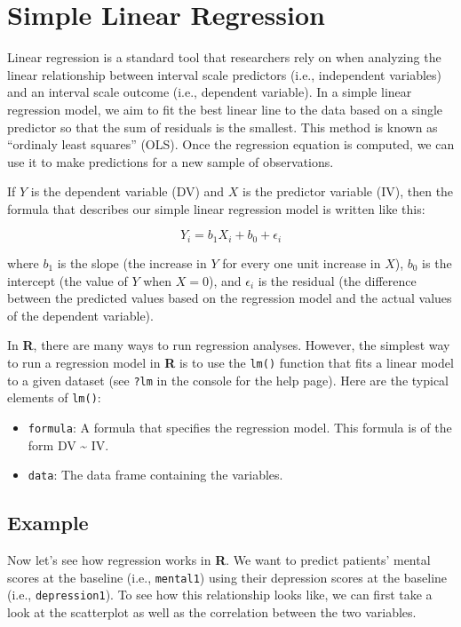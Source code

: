 \documentclass[]{book}
\providecommand{\tightlist}{%
  \setlength{\itemsep}{0pt}\setlength{\parskip}{0pt}}
\begin{document}
\hypertarget{simple-linear-regression}{%
\section{Simple Linear Regression}\label{simple-linear-regression}}

Linear regression is a standard tool that researchers rely on when analyzing the linear relationship between interval scale predictors (i.e., independent variables) and an interval scale outcome (i.e., dependent variable). In a simple linear regression model, we aim to fit the best linear line to the data based on a single predictor so that the sum of residuals is the smallest. This method is known as ``ordinaly least squares'' (OLS). Once the regression equation is computed, we can use it to make predictions for a new sample of observations.

If \(Y\) is the dependent variable (DV) and \(X\) is the predictor variable (IV), then the formula that describes our simple linear regression model is written like this:

\[ Y_i = b_1 X_i + b_0 + \epsilon_i\]

where \(b_1\) is the slope (the increase in \(Y\) for every one unit increase in \(X\)), \(b_0\) is the intercept (the value of \(Y\) when \(X=0\)), and \(\epsilon_i\) is the residual (the difference between the predicted values based on the regression model and the actual values of the dependent variable).

In \textbf{R}, there are many ways to run regression analyses. However, the simplest way to run a regression model in \textbf{R} is to use the \texttt{lm()} function that fits a linear model to a given dataset (see \texttt{?lm} in the console for the help page). Here are the typical elements of \texttt{lm()}:

\begin{itemize}
\tightlist
\item
  \texttt{formula}: A formula that specifies the regression model. This formula is of the form DV \textasciitilde{} IV.
\item
  \texttt{data}: The data frame containing the variables.
\end{itemize}

\hypertarget{example-4}{%
\subsection{Example}\label{example-4}}

Now let's see how regression works in \textbf{R}. We want to predict patients' mental scores at the baseline (i.e., \texttt{mental1}) using their depression scores at the baseline (i.e., \texttt{depression1}). To see how this relationship looks like, we can first take a look at the scatterplot as well as the correlation between the two variables.
\end{document}
